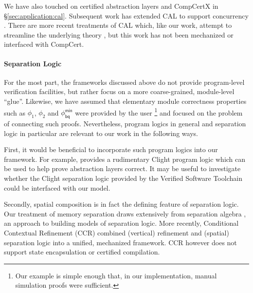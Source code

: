 \documentclass[acmsmall,screen,review,nonacm]{acmart}
\newcommand{\kw}[1]{\ensuremath{ \mathsf{#1} }}
\begin{document}
We have also touched on
certified abstraction layers and CompCertX in \S\ref{sec:application:cal}.
Subsequent work has extended CAL to support concurrency \cite{ccal}.
There are more recent treatments of CAL which,
like our work,
attempt to streamline the underlying theory
\citep{popl22,rbgs-cal},
but this work has not been mechanized
or interfaced with CompCert.



\paragraph{Separation Logic} %

For the most part,
the frameworks discussed above
do not provide program-level verification facilities,
but rather focus on a more coarse-grained, module-level ``glue''.
Likewise,
we have assumed that elementary module correctness properties
such as $\phi_1$, $\phi_2$ and $\phi_\kw{bq}^\kw{min}$
were provided by the user%
\footnote{Our example is simple enough that,
  in our implementation,
  manual simulation proofs were
  sufficient.}
and focused on the problem of
connecting such proofs.
Nevertheless,
program logics in general and separation logic in particular
are relevant to our work in the following ways.

First, it would be beneficial to incorporate
such program logics into our framework.
For example, \citet{popl15} provides
a rudimentary Clight program logic which
can be used to help prove abstraction layers correct. 
It may be useful to investigate whether
the Clight separation logic provided by
the Verified Software Toolchain \cite{vst}
could be interfaced with our model.

Secondly,
spatial composition is in fact
the defining feature of separation logic.
Our treatment of memory separation
draws extensively from
separation algebra \cite{sepalg},
an approach to building models of separation logic.
More recently,
Conditional Contextual Refinement (CCR) \cite{ccr}
combined (vertical) refinement and (spatial) separation logic into
a unified, mechanized framework.
CCR however does not support state encapsulation
or certified compilation.
\end{document}
